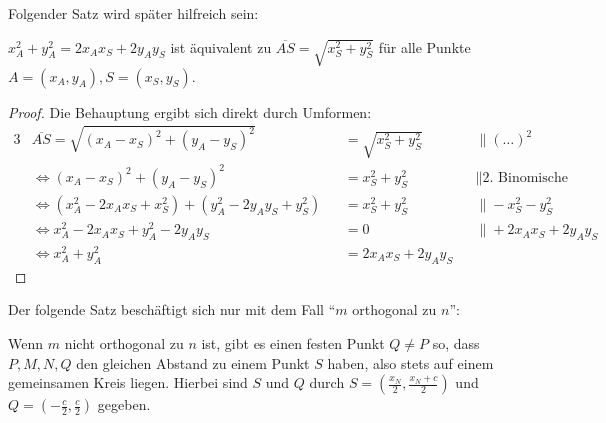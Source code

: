 Folgender Satz wird später hilfreich sein:
\begin{thm}\label{cor_hilfe}
    $x_A^2+y_A^2=2x_Ax_S+2y_Ay_S$ ist äquivalent zu $\overline{AS}=\sqrt{x_S^2+y_S^2}$ für alle 
    Punkte $A=(x_A, y_A), S=(x_S, y_S)$.
\end{thm}
\begin{proof}
    Die Behauptung ergibt sich direkt durch Umformen:
    \begin{alignat*}{3}
        &\overline{AS}=\sqrt{(x_A-x_S)^2+(y_A-y_S)^2}&&=\sqrt{x_S^2+y_S^2}\quad&&\|(\ldots)^2\\
        &\Leftrightarrow (x_A-x_S)^2+(y_A-y_S)^2&&=x_S^2+y_S^2\quad &&\|\text{2. Binomische Formel}\\
        &\Leftrightarrow (x_A^2-2x_Ax_S+x_S^2)+(y_A^2-2y_Ay_S+y_S^2)&&=x_S^2+y_S^2\quad &&\|-x_S^2-y_S^2\\
        &\Leftrightarrow x_A^2-2x_Ax_S+y_A^2-2y_Ay_S&&=0\quad &&\|+2x_Ax_S+2y_Ay_S\\
        &\Leftrightarrow x_A^2+y_A^2&&=2x_Ax_S+2y_Ay_S&&
    \end{alignat*}
\end{proof}
Der folgende Satz beschäftigt sich nur mit dem Fall "`$m$ orthogonal zu $n$"':
\begin{thm}\label{aufgabe_3}
    Wenn $m$ nicht orthogonal zu $n$ ist, gibt es einen festen Punkt $Q\neq P$ so, dass $P, M, N, Q$ 
    den gleichen Abstand zu einem Punkt $S$ haben, also stets auf einem gemeinsamen Kreis liegen. 
    Hierbei sind $S$ und $Q$ durch $S=\left(\frac{x_N}{2}, \frac{x_N+c}{2}\right)$ und $Q=\left(-\frac{c}{2}, 
    \frac{c}{2}\right)$ gegeben.
\end{thm}
